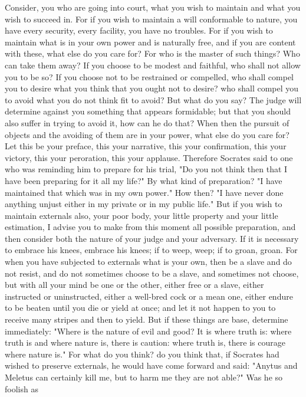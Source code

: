 \documentclass[a4paper]{article}
\begin{document}
    Consider, you who are going into court, what you wish to maintain and what
you wish to succeed in. For if you wish to maintain a will conformable to
nature, you have every security, every facility, you have no troubles. For if
you wish to maintain what is in your own power and is naturally free, and if
you are content with these, what else do you care for? For who is the master of
such things? Who can take them away? If you choose to be modest and faithful,
who shall not allow you to be so? If you choose not to be restrained or
compelled, who shall compel you to desire what you think that you ought not to
desire? who shall compel you to avoid what you do not think fit to avoid? But
what do you say? The judge will determine against you something that appears
formidable; but that you should also suffer in trying to avoid it, how can he
do that? When then the pursuit of objects and the avoiding of them are in your
power, what else do you care for? Let this be your preface, this your
narrative, this your confirmation, this your victory, this your peroration,
this your applause.
    Therefore Socrates said to one who was reminding him to prepare for his
trial, "Do you not think then that I have been preparing for it all my life?"
By what kind of preparation? "I have maintained that which was in my own
power." How then? "I have never done anything unjust either in my private or in
my public life."
    But if you wish to maintain externals also, your poor body, your little
property and your little estimation, I advise you to make from this moment all
possible preparation, and then consider both the nature of your judge and your
adversary. If it is necessary to embrace his knees, embrace his knees; if to
weep, weep; if to groan, groan. For when you have subjected to externals what
is your own, then be a slave and do not resist, and do not sometimes choose to
be a slave, and sometimes not choose, but with all your mind be one or the
other, either free or a slave, either instructed or uninstructed, either a
well-bred cock or a mean one, either endure to be beaten until you die or yield
at once; and let it not happen to you to receive many stripes and then to
yield. But if these things are base, determine immediately: "Where is the
nature of evil and good? It is where truth is: where truth is and where nature
is, there is caution: where truth is, there is courage where nature is."
    For what do you think? do you think that, if Socrates had wished to
preserve externals, he would have come forward and said: "Anytus and Meletus
can certainly kill me, but to harm me they are not able?" Was he so foolish as
\end{document}
